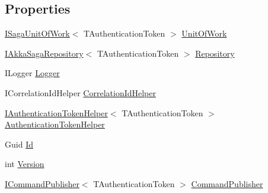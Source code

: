 \subsection*{Properties}
\begin{DoxyCompactItemize}
\item 
\hyperlink{interfaceCqrs_1_1Domain_1_1ISagaUnitOfWork}{I\+Saga\+Unit\+Of\+Work}$<$ T\+Authentication\+Token $>$ \hyperlink{classCqrs_1_1Akka_1_1Domain_1_1AkkaSaga_addbf93da18d577da8f8f1e2dba5cafb9_addbf93da18d577da8f8f1e2dba5cafb9}{Unit\+Of\+Work}
\item 
\hyperlink{interfaceCqrs_1_1Akka_1_1Domain_1_1IAkkaSagaRepository}{I\+Akka\+Saga\+Repository}$<$ T\+Authentication\+Token $>$ \hyperlink{classCqrs_1_1Akka_1_1Domain_1_1AkkaSaga_a4c0662a1aa78c8de5fa32c71a54cf393_a4c0662a1aa78c8de5fa32c71a54cf393}{Repository}
\item 
I\+Logger \hyperlink{classCqrs_1_1Akka_1_1Domain_1_1AkkaSaga_acbb9a6e1cde3e2846270a8fe3f55bc92_acbb9a6e1cde3e2846270a8fe3f55bc92}{Logger}
\item 
I\+Correlation\+Id\+Helper \hyperlink{classCqrs_1_1Akka_1_1Domain_1_1AkkaSaga_a11d543b42aa6e55644c2b349336e962a_a11d543b42aa6e55644c2b349336e962a}{Correlation\+Id\+Helper}
\item 
\hyperlink{interfaceCqrs_1_1Authentication_1_1IAuthenticationTokenHelper}{I\+Authentication\+Token\+Helper}$<$ T\+Authentication\+Token $>$ \hyperlink{classCqrs_1_1Akka_1_1Domain_1_1AkkaSaga_a18e4d7faa9cd9d10ac2ac0bd3b6c9fc9_a18e4d7faa9cd9d10ac2ac0bd3b6c9fc9}{Authentication\+Token\+Helper}
\item 
Guid \hyperlink{classCqrs_1_1Akka_1_1Domain_1_1AkkaSaga_a98fa8a5ebc587bc02b1c98d5ffbc997e_a98fa8a5ebc587bc02b1c98d5ffbc997e}{Id}
\item 
int \hyperlink{classCqrs_1_1Akka_1_1Domain_1_1AkkaSaga_a3fda31a3857e12a1aed60f4a4f04edd1_a3fda31a3857e12a1aed60f4a4f04edd1}{Version}
\item 
\hyperlink{interfaceCqrs_1_1Commands_1_1ICommandPublisher}{I\+Command\+Publisher}$<$ T\+Authentication\+Token $>$ \hyperlink{classCqrs_1_1Akka_1_1Domain_1_1AkkaSaga_ac00968d1d69d89d46b43af10fc0d4510_ac00968d1d69d89d46b43af10fc0d4510}{Command\+Publisher}
\end{DoxyCompactItemize}


